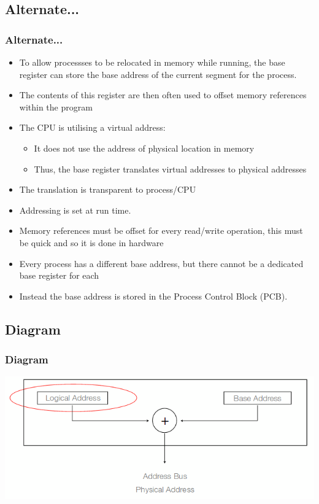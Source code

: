 \documentclass{beamer}
\begin{document}
\subsection{Alternate...}
\begin{frame}
\frametitle{Alternate...}
\begin{itemize}
\item To allow processses to be relocated in memory while running, the {\color{red}base register} can store the base address of the current segment for the process.
\item The contents of this register are then often used to offset memory references within the program
\item The CPU is utilising a {\color{green}virtual address}:
\begin{itemize}
\item It does not use the address of physical location in memory
\item Thus, the base register translates virtual addresses to physical addresses
\end{itemize}
\item The translation is transparent to process/CPU
\item Addressing is set at run time.
\item Memory references must be offset for every read/write operation, this must be quick and so it is done in hardware
\item Every process has a different base address, but there cannot be a dedicated base register for each
\item Instead the base address is stored in the Process Control Block (PCB).
\end{itemize}
\end{frame}
\subsection{Diagram}
\begin{frame}
\frametitle{Diagram}
\includegraphics[scale=0.5]{dynam.png}
\end{frame}
\end{document}
